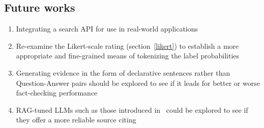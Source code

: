 \subsection{Future works}
\begin{enumerate}
    \item Integrating a search API for use in real-world applications
    \item Re-examine the Likert-scale rating (section~\ref{likert}) to establish a more appropriate and fine-grained means of tokenizing the label probabilities
    \item Generating evidence in the form of declarative sentences rather than Question-Answer pairs should be explored to see if it leads for better or worse fact-checking performance
    \item RAG-tuned LLMs such as those introduced in~\cite{menick2022teachinglanguagemodelssupport} could be explored to see if they offer a more reliable source citing
\end{enumerate}